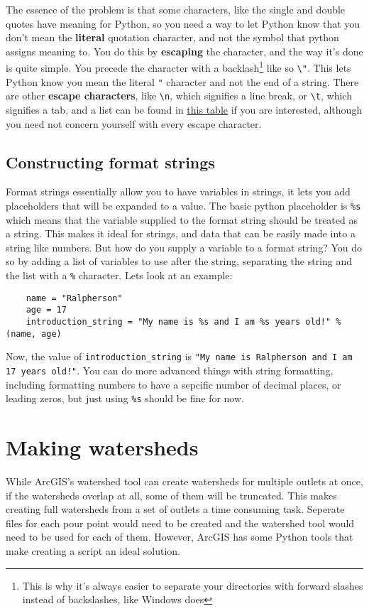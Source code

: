 \documentclass{article}
\begin{document}
The essence of the problem is that some characters, like the single and double quotes have meaning for Python, so you need a way to let Python know that you don't mean the \textbf{literal} quotation character, and not the symbol that python assigns meaning to.  You do this by \textbf{escaping} the character, and the way it's done is quite simple.  You precede the character with a backlash\footnote{This is why it's always easier to separate your directories with forward slashes instead of backslashes, like Windows does} like so \verb+\"+.  This lets Python know you mean the literal \verb+"+ character and not the end of a string.  There are other \textbf{escape characters}, like \verb+\n+, which signifies a line break, or \verb+\t+, which signifies a tab, and a list can be found in \href{https://docs.python.org/2/reference/lexical_analysis.html#string-literals}{this table} if you are interested, although you need not concern yourself with every escape character.

\subsection{Constructing format strings}
Format strings essentially allow you to have variables in strings, it lets you add placeholders that will be expanded to a value.  The basic python placeholder is \verb+%s+ which means that the variable supplied to the format string should be treated as a string.  This makes it ideal for strings, and data that can be easily made into a string like numbers.  But how do you supply a variable to a format string?  You do so by adding a list of variables to use after the string, separating the string and the list with a \verb+%+ character.  Lets look at an example:

\begin{lstlisting}
    name = "Ralpherson"
    age = 17
    introduction_string = "My name is %s and I am %s years old!" % (name, age)
\end{lstlisting}

Now, the value of \verb+introduction_string+ is \verb+"My name is Ralpherson and I am 17 years old!"+.  You can do more advanced things with string formatting, including formatting numbers to have a sepcific number of decimal places, or leading zeros, but just using \verb+%s+ should be fine for now.

\section{Making watersheds}
While ArcGIS's watershed tool can create watersheds for multiple outlets at once, if the watersheds overlap at all, some of them will be truncated.  This makes creating full watersheds from a set of outlets a time consuming task.  Seperate files for each pour point would need to be created and the watershed tool would need to be used for each of them.  However, ArcGIS has some Python tools that make creating a script an ideal solution.
\end{document}
